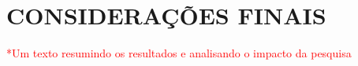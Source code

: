 \chapter{CONSIDERAÇÕES FINAIS}

\textcolor{red}{*Um texto resumindo os resultados e analisando o impacto da pesquisa}